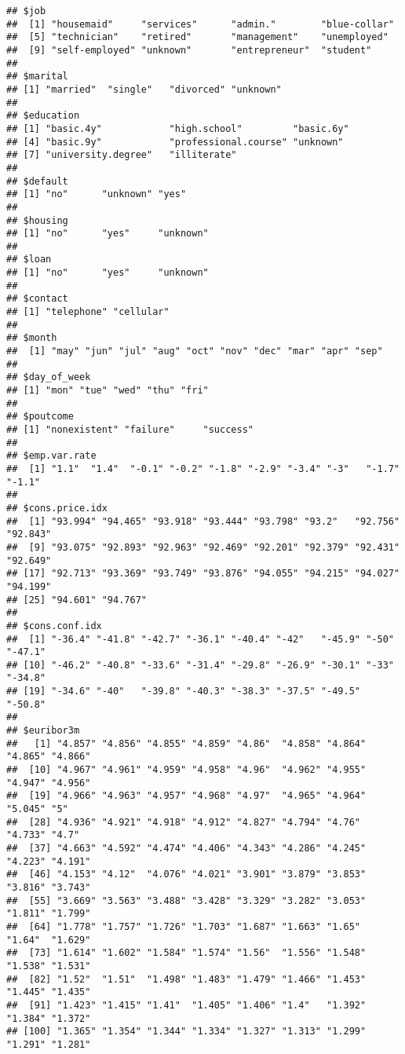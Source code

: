\documentclass[
]{article}
\begin{document}
\begin{verbatim}
## $job
##  [1] "housemaid"     "services"      "admin."        "blue-collar"  
##  [5] "technician"    "retired"       "management"    "unemployed"   
##  [9] "self-employed" "unknown"       "entrepreneur"  "student"      
## 
## $marital
## [1] "married"  "single"   "divorced" "unknown" 
## 
## $education
## [1] "basic.4y"            "high.school"         "basic.6y"           
## [4] "basic.9y"            "professional.course" "unknown"            
## [7] "university.degree"   "illiterate"         
## 
## $default
## [1] "no"      "unknown" "yes"    
## 
## $housing
## [1] "no"      "yes"     "unknown"
## 
## $loan
## [1] "no"      "yes"     "unknown"
## 
## $contact
## [1] "telephone" "cellular" 
## 
## $month
##  [1] "may" "jun" "jul" "aug" "oct" "nov" "dec" "mar" "apr" "sep"
## 
## $day_of_week
## [1] "mon" "tue" "wed" "thu" "fri"
## 
## $poutcome
## [1] "nonexistent" "failure"     "success"    
## 
## $emp.var.rate
##  [1] "1.1"  "1.4"  "-0.1" "-0.2" "-1.8" "-2.9" "-3.4" "-3"   "-1.7" "-1.1"
## 
## $cons.price.idx
##  [1] "93.994" "94.465" "93.918" "93.444" "93.798" "93.2"   "92.756" "92.843"
##  [9] "93.075" "92.893" "92.963" "92.469" "92.201" "92.379" "92.431" "92.649"
## [17] "92.713" "93.369" "93.749" "93.876" "94.055" "94.215" "94.027" "94.199"
## [25] "94.601" "94.767"
## 
## $cons.conf.idx
##  [1] "-36.4" "-41.8" "-42.7" "-36.1" "-40.4" "-42"   "-45.9" "-50"   "-47.1"
## [10] "-46.2" "-40.8" "-33.6" "-31.4" "-29.8" "-26.9" "-30.1" "-33"   "-34.8"
## [19] "-34.6" "-40"   "-39.8" "-40.3" "-38.3" "-37.5" "-49.5" "-50.8"
## 
## $euribor3m
##   [1] "4.857" "4.856" "4.855" "4.859" "4.86"  "4.858" "4.864" "4.865" "4.866"
##  [10] "4.967" "4.961" "4.959" "4.958" "4.96"  "4.962" "4.955" "4.947" "4.956"
##  [19] "4.966" "4.963" "4.957" "4.968" "4.97"  "4.965" "4.964" "5.045" "5"    
##  [28] "4.936" "4.921" "4.918" "4.912" "4.827" "4.794" "4.76"  "4.733" "4.7"  
##  [37] "4.663" "4.592" "4.474" "4.406" "4.343" "4.286" "4.245" "4.223" "4.191"
##  [46] "4.153" "4.12"  "4.076" "4.021" "3.901" "3.879" "3.853" "3.816" "3.743"
##  [55] "3.669" "3.563" "3.488" "3.428" "3.329" "3.282" "3.053" "1.811" "1.799"
##  [64] "1.778" "1.757" "1.726" "1.703" "1.687" "1.663" "1.65"  "1.64"  "1.629"
##  [73] "1.614" "1.602" "1.584" "1.574" "1.56"  "1.556" "1.548" "1.538" "1.531"
##  [82] "1.52"  "1.51"  "1.498" "1.483" "1.479" "1.466" "1.453" "1.445" "1.435"
##  [91] "1.423" "1.415" "1.41"  "1.405" "1.406" "1.4"   "1.392" "1.384" "1.372"
## [100] "1.365" "1.354" "1.344" "1.334" "1.327" "1.313" "1.299" "1.291" "1.281"

\end{verbatim}
\end{document}
